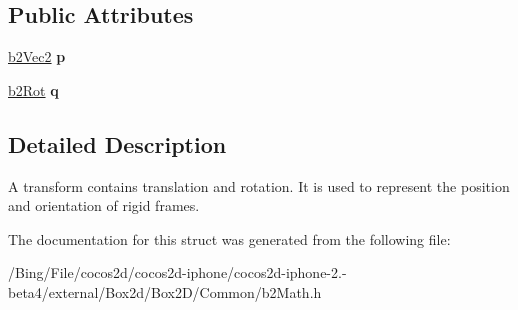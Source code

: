 \subsection*{Public Attributes}
\begin{DoxyCompactItemize}
\item 
\hypertarget{structb2_transform_a9eeeb643a016c29a4d389e480ba6c628}{\hyperlink{structb2_vec2}{b2\-Vec2} {\bfseries p}}\label{structb2_transform_a9eeeb643a016c29a4d389e480ba6c628}

\item 
\hypertarget{structb2_transform_ae4aaac23f32686e165138c4e5dc4ce85}{\hyperlink{structb2_rot}{b2\-Rot} {\bfseries q}}\label{structb2_transform_ae4aaac23f32686e165138c4e5dc4ce85}

\end{DoxyCompactItemize}


\subsection{Detailed Description}
A transform contains translation and rotation. It is used to represent the position and orientation of rigid frames. 

The documentation for this struct was generated from the following file\-:\begin{DoxyCompactItemize}
\item 
/\-Bing/\-File/cocos2d/cocos2d-\/iphone/cocos2d-\/iphone-\/2.-\/beta4/external/\-Box2d/\-Box2\-D/\-Common/b2\-Math.\-h\end{DoxyCompactItemize}
